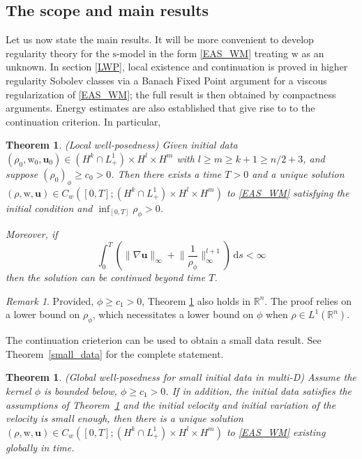 \documentclass[11pt,letterpaper]{amsart}
\theoremstyle{plain}
\newtheorem{theorem}[THEOREM]{Theorem}
\theoremstyle{definition}
\theoremstyle{remark}
\newtheorem{remark}[THEOREM]{Remark}
\newcommand{\thm}[1]{Theorem~\ref{#1}}
\newcommand{\R}{\ensuremath{\mathbb{R}}}   %
\renewcommand{\geq}{\geqslant}
\def \ds  {\, \mbox{d}s}
\def\R{\mathbb{R}}
\def\u{\textbf{u}}
\def \st {\mathrm{s}}
\def \wt {\mathrm{w}}
\begin{document}
\subsection{The scope and main results}
\label{intro:main_results}
Let us now state the main results. 
It will be more convenient to develop regularity theory for the $\st$-model in the form \eqref{EAS_WM} treating $\wt$ as an unknown.   
In section \ref{LWP}, local existence and continuation is proved in higher regularity Sobolev classes via a Banach Fixed Point argument 
for a viscous regularization of \eqref{EAS_WM}; the full result is then obtained by compactness arguments.  
Energy estimates are also established that give rise to to the continuation criterion.  In particular,
\begin{theorem} (Local well-posedness)  \label{lwp}
    Given initial data $(\rho_0, \wt_0, \u_0) \in (H^k \cap L_+^1) \times H^l \times H^m$ 
    with $l \geq m \geq k+1 \geq n/2 + 3$, and suppose $(\rho_0)_{\phi} \geq c_0 > 0$.
    Then there exists a time $T > 0$ and a unique solution $(\rho, \wt, \u) \in C_w([0,T]; (H^k \cap L_+^1) \times H^l \times H^m)$
    to \eqref{EAS_WM} satisfying the initial condition and $\inf_{[0,T]} \rho_{\phi} >0$.
    
Moreover, if 
\begin{equation}
    \label{cont_criterion}
    \int_0^{T}\left( \|\nabla \u\|_{\infty} + \Big\|\frac{1}{\rho_{\phi}} \Big\|_{\infty}^{l+1} \right) \ds < \infty
\end{equation}
then the solution can be continued beyond time $T$.
\end{theorem}

\begin{remark}
    Provided, $\phi \geq c_1 > 0$, Theorem \ref{lwp} also holds in $\R^n$. 
    The proof relies on a lower bound on $\rho_{\phi}$, which necessitates 
    a lower bound on $\phi$ when $\rho \in L^1(\R^n)$.
\end{remark}

The continuation crieterion can be used to obtain a small data result.  
See \thm{small_data} for the complete statement. 
\begin{theorem} (Global well-posedness for small initial data in multi-D)
    \label{thm:small_data_intro}
    Assume the kernel $\phi$ is bounded below, $\phi \geq c_1 > 0$. If in addition, the initial data satisfies the assumptions 
    of \thm{lwp} and the initial velocity and initial variation of the velocity is small enough, then there is a unique solution 
    $(\rho, \wt, \u) \in C_w([0,T]; (H^k \cap L^1_+) \times H^l \times H^m)$ to \eqref{EAS_WM}
    existing globally in time.
\end{theorem}
\end{document}
